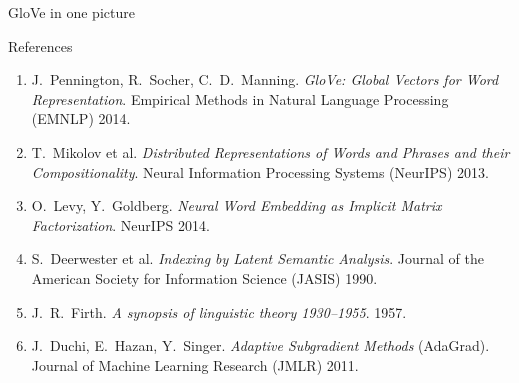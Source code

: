 \documentclass[aspectratio=169,11pt]{beamer}
\newcommand{\wv}{\mathbf{w}}
\newcommand{\cv}{\tilde{\mathbf{w}}}
\begin{document}
\begin{frame}{GloVe in one picture}
\centering
{}
\end{frame}

\begin{frame}{References}
\small
\begin{enumerate}
  \item J.~Pennington, R.~Socher, C.~D.~Manning. \emph{GloVe: Global Vectors for Word Representation}. Empirical Methods in Natural Language Processing (EMNLP) 2014.
  \item T.~Mikolov et al. \emph{Distributed Representations of Words and Phrases and their Compositionality}. Neural Information Processing Systems (NeurIPS) 2013.
  \item O.~Levy, Y.~Goldberg. \emph{Neural Word Embedding as Implicit Matrix Factorization}. NeurIPS 2014.
  \item S.~Deerwester et al. \emph{Indexing by Latent Semantic Analysis}. Journal of the American Society for Information Science (JASIS) 1990.
  \item J.~R.~Firth. \emph{A synopsis of linguistic theory 1930--1955}. 1957.
  \item J.~Duchi, E.~Hazan, Y.~Singer. \emph{Adaptive Subgradient Methods} (AdaGrad). Journal of Machine Learning Research (JMLR) 2011.
\end{enumerate}
\end{frame}
\end{document}
